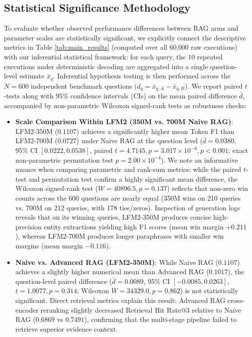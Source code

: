 \documentclass[conference]{IEEEtran}
\begin{document}
\subsection{Statistical Significance Methodology}
To evaluate whether observed performance differences between RAG arms and parameter scales are statistically significant, we explicitly connect the descriptive metrics in Table \ref{tab:main_results} (computed over all 60,000 raw executions) with our inferential statistical framework: for each query, the 10 repeated executions under deterministic decoding are aggregated into a single question-level estimate $\bar{x}_q$. Inferential hypothesis testing is then performed across the $N=600$ independent benchmark questions ($d_q = \bar{x}_{q,A} - \bar{x}_{q,B}$). We report paired $t$-tests along with 95\% confidence intervals (CIs) on the mean paired difference $\bar{d}$, accompanied by non-parametric Wilcoxon signed-rank tests as robustness checks:
\begin{itemize}
    \item \textbf{Scale Comparison Within LFM2 (350M vs. 700M Naive RAG)}: LFM2-350M ($0.1107$) achieves a significantly higher mean Token F1 than LFM2-700M ($0.0727$) under Naive RAG at the question level ($\bar{d} = 0.0380$, 95\% CI $[0.0222, 0.0538]$, paired $t=4.7145, p=3.017 \times 10^{-6}, p < 0.001$; exact non-parametric permutation test $p=2.00 \times 10^{-4}$). We note an informative nuance when comparing parametric and rank-sum metrics: while the paired $t$-test and permutation test confirm a highly significant mean difference, the Wilcoxon signed-rank test ($W=40896.5, p=0.137$) reflects that non-zero win counts across the 600 questions are nearly equal (350M wins on 210 queries vs. 700M on 212 queries, with 178 ties/zeros). Inspection of generation logs reveals that on its winning queries, LFM2-350M produces concise high-precision entity extractions yielding high F1 scores (mean win margin $+0.211$), whereas LFM2-700M produces longer paraphrases with smaller win margins (mean margin $-0.116$).
    \item \textbf{Naive vs. Advanced RAG (LFM2-350M)}: While Naive RAG ($0.1107$) achieves a slightly higher numerical mean than Advanced RAG ($0.1017$), the question-level paired difference ($\bar{d} = 0.0089$, 95\% CI $[-0.0085, 0.0263]$, $t=1.0077, p=0.314$; Wilcoxon $W=34329.0, p=0.862$) is not statistically significant. Direct retrieval metrics explain this result: Advanced RAG cross-encoder reranking slightly decreased Retrieval Hit Rate@3 relative to Naive RAG ($0.6869$ vs $0.7491$), confirming that the multi-stage pipeline failed to retrieve superior evidence context.
\end{itemize}
\end{document}
